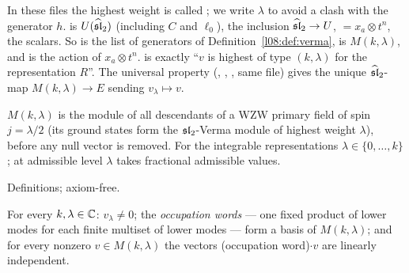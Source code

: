 \begin{dictionary}
In these files the highest weight is called ; we write $\lambda$ to avoid a clash with the generator
$h$.  is $U(\widehat{\mathfrak{sl}}_2)$ (including $C$ and $\ell_0$),  the inclusion
$\widehat{\mathfrak{sl}}_2\to U$,  $=x_a\otimes t^n$,  the scalars. So
 is the list of generators of Definition~\ref{l08:def:verma},  is
$M(k,\lambda)$, and  is the action of $x_a\otimes t^n$.  is exactly
``$v$ is highest of type $(k,\lambda)$ for the representation $R$''. The universal property
(, , \allowbreak{}, same file) gives
the unique $\widehat{\mathfrak{sl}}_2$-map $M(k,\lambda)\to E$ sending $v_\lambda\mapsto v$.
\end{dictionary}

\begin{physics}
$M(k,\lambda)$ is the module of all descendants of a WZW primary field of spin $j=\lambda/2$ (its
ground states form the $\mathfrak{sl}_2$-Verma module of highest weight $\lambda$), before any null vector is
removed. For the integrable representations $\lambda\in\{0,\ldots,k\}$; at admissible level $\lambda$ takes
fractional admissible values.
\end{physics}

\begin{status}
Definitions; axiom-free.
\end{status}

\begin{theorem}\label{l08:thm:vermapbw}
For every $k,\lambda\in{\mathbb{C}}$: $v_\lambda\ne0$; the \emph{occupation words} --- one fixed product of lower
modes for each finite multiset of lower modes --- form a basis of $M(k,\lambda)$; and for every nonzero
$v\in M(k,\lambda)$ the vectors (occupation word)$\cdot v$ are linearly independent.
\end{theorem}

